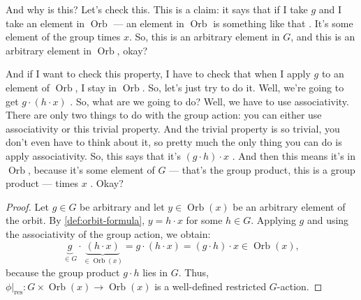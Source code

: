 \begin{proofWrapper}
\begin{speech}[00:21:14 - 00:22:26]
And why is this? Let's check this. This is a claim: it says that if I take $g$ and I take an element in $\operatorname{Orb}$ --- an element in $\operatorname{Orb}$ is something like that . It's some element of the group times $x$. So, this is an arbitrary element in $G$, and this is an arbitrary element in $\operatorname{Orb}$, okay?

And if I want to check this property, I have to check that when I apply $g$ to an element of $\operatorname{Orb}$, I stay in $\operatorname{Orb}$. So, let's just try to do it. Well, we're going to get $g \cdot (h \cdot x)$ . So, what are we going to do? Well, we have to use associativity. There are only two things to do with the group action: you can either use associativity or this trivial property. And the trivial property is so trivial, you don't even have to think about it, so pretty much the only thing you can do is apply associativity. So, this says that it's $(g \cdot h) \cdot x$ . And then this means it's in $\operatorname{Orb}$, because it's some element of $G$ --- that's the group product, this is a group product --- times $x$ . Okay?
\end{speech}

\begin{content}
\begin{proof}
Let $g \in G$ be arbitrary and let $y \in \operatorname{Orb}(x)$ be an arbitrary element of the orbit. By \cref{def:orbit-formula}, $y = h \cdot x$ for some $h \in G$. Applying $g$ and using the associativity of the group action, we obtain:
\[
\underbrace{g}_{\in G} \cdot \underbrace{(h \cdot x)}_{\in \operatorname{Orb}(x)} = g \cdot (h \cdot x) = (g \cdot h) \cdot x \in \operatorname{Orb}(x),
\]
because the group product $g \cdot h$ lies in $G$. Thus, $\phi\big|_{\text{res}} \colon G \times \operatorname{Orb}(x) \to \operatorname{Orb}(x)$ is a well-defined restricted $G$-action.
\end{proof}
\end{content}
\end{proofWrapper}

